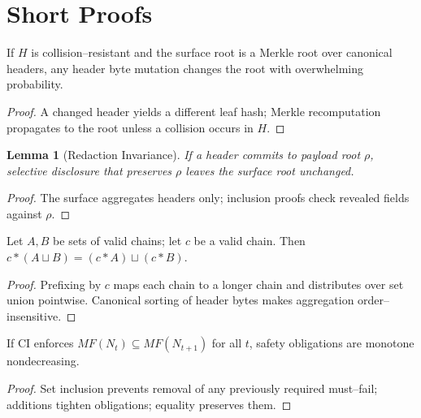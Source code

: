\documentclass[11pt,a4paper]{article}
\numberwithin{equation}{section}
\theoremstyle{plain}
\newtheorem{lemma}[theorem]{Lemma}
\theoremstyle{definition}
\theoremstyle{remark}
\begin{document}
\section{Short Proofs}
\label{sec:proofs}
\begin{proposition}
If $H$ is collision--resistant and the surface root is a Merkle root over canonical headers, any header byte mutation changes the root with overwhelming probability.
\end{proposition}
\begin{proof}
A changed header yields a different leaf hash; Merkle recomputation propagates to the root unless a collision occurs in $H$.
\end{proof}

\begin{lemma}[Redaction Invariance]
If a header commits to payload root $\rho$, selective disclosure that preserves $\rho$ leaves the surface root unchanged.
\end{lemma}
\begin{proof}
The surface aggregates headers only; inclusion proofs check revealed fields against $\rho$.
\end{proof}

\begin{proposition}
Let $A,B$ be sets of valid chains; let $c$ be a valid chain. Then
$c\ast (A\sqcup B)=(c\ast A)\sqcup (c\ast B)$.
\end{proposition}
\begin{proof}
Prefixing by $c$ maps each chain to a longer chain and distributes over set union pointwise.
Canonical sorting of header bytes makes aggregation order--insensitive.
\end{proof}

\begin{proposition}
If CI enforces $MF(N_t)\subseteq MF(N_{t+1})$ for all $t$, safety obligations are monotone nondecreasing.
\end{proposition}
\begin{proof}
Set inclusion prevents removal of any previously required must--fail; additions tighten obligations; equality preserves them.
\end{proof}
\end{document}
